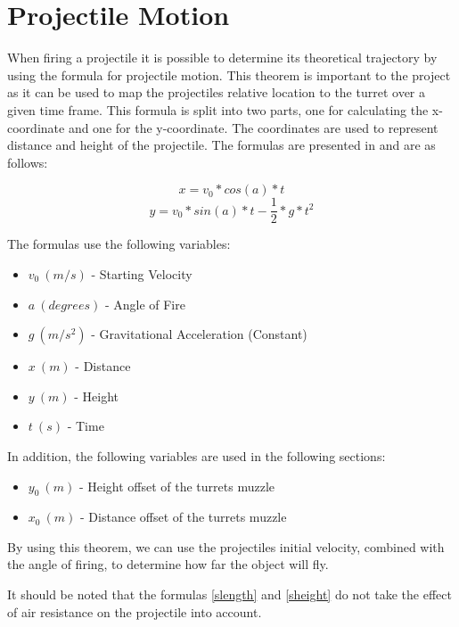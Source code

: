 \section{Projectile Motion}\label{ProjMotion}
When firing a projectile it is possible to determine its theoretical trajectory
by using the formula for projectile motion. This theorem is important to the
project as it can be used to map the projectiles relative location to the turret
over a given time frame. This formula is split into two parts, one for
calculating the x-coordinate and one for the y-coordinate. The coordinates are
used to represent distance and height of the projectile. The formulas are
presented in \citep[Ch. 6.2]{OrbitBA} and are as follows:

\begin{equation}\label{slength}
x=v_0*cos(a)*t
\end{equation}
\begin{equation}\label{sheight}
y=v_0*sin(a)*t-\frac{1}{2}*g*t^2
\end{equation}

The formulas use the following variables:
\begin{itemize}
  \item $v_0\ (m/s)$ - Starting Velocity
  \item $a\ (degrees)$ - Angle of Fire
  \item $g\ (m/s^2)$ - Gravitational Acceleration (Constant)
  \item $x\ (m)$ - Distance
  \item $y\ (m)$ - Height
  \item $t\ (s)$ - Time
\end{itemize}
In addition, the following variables are used in the following sections:
\begin{itemize}
  \item $y_0\ (m)$ - Height offset of the turrets muzzle
  \item $x_0\ (m)$ - Distance offset of the turrets muzzle
\end{itemize}

By using this theorem, we can use the projectiles initial velocity, combined
with the angle of firing, to determine how far the object will fly.\nl

It should be noted that the formulas \autoref{slength} and \autoref{sheight} do
not take the effect of air resistance on the projectile into account. 


